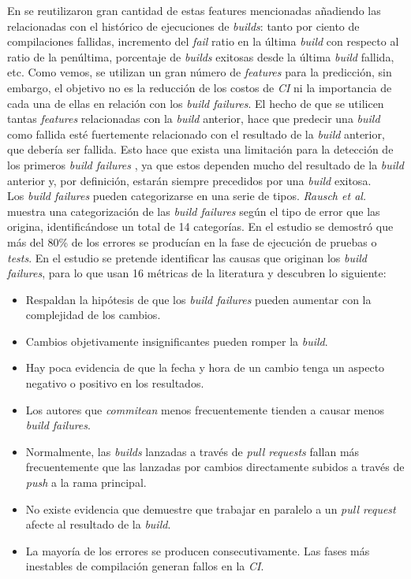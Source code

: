 En \cite{6} se reutilizaron gran cantidad de estas features mencionadas añadiendo las
relacionadas con el histórico de ejecuciones de \textit{builds}: tanto por ciento de compilaciones
fallidas, incremento del \textit{fail} ratio en la última \textit{build} con respecto al ratio
de la penúltima, porcentaje de \textit{builds} exitosas desde la última \textit{build} fallida,
etc. Como vemos, se utilizan un gran número de \textit{features} para la predicción, sin embargo,
el objetivo no es la reducción de los costos de \textit{CI} ni la  importancia de cada una de
ellas en relación con los \textit{build failures}. El hecho de que se utilicen tantas
\textit{features} relacionadas con la \textit{build} anterior, hace que predecir una
\textit{build} como fallida esté fuertemente relacionado con el resultado de la \textit{build}
anterior, que debería ser fallida. Esto hace que exista una limitación para la detección de los
primeros \textit{build failures} \cite{2}, ya que estos dependen mucho del resultado de la
\textit{build} anterior y, por definición, estarán siempre precedidos por una \textit{build}
exitosa.\\

Los \textit{build failures} pueden categorizarse en una serie de tipos. \textit{Rausch et al.}
\cite{13} muestra una categorización de las \textit{build failures} según el tipo de error
que las origina, identificándose un total de 14 categorías. En el estudio se demostró que más
del 80\% de los errores se producían en la fase de ejecución de pruebas o \textit{tests}. En
el estudio se pretende identificar las causas que originan los \textit{build failures}, para lo
que usan 16 métricas de la literatura y descubren lo siguiente:

\begin{itemize}
      \item Respaldan la hipótesis de que los \textit{build failures} pueden aumentar con la 
      complejidad de los cambios.
      \item Cambios objetivamente insignificantes pueden romper la \textit{build}.
      \item Hay poca evidencia de que la fecha y hora de un cambio tenga un aspecto negativo o
      positivo en los resultados.
      \item Los autores que \textit{commitean} menos frecuentemente tienden a causar menos
      \textit{build failures}.
      \item Normalmente, las \textit{builds} lanzadas a través de \textit{pull requests} fallan
      más frecuentemente que las lanzadas por cambios directamente subidos a través de
      \textit{push} a la rama principal.
      \item No existe evidencia que demuestre que trabajar en paralelo a un \textit{pull request}
      afecte al resultado de la \textit{build}.
      \item La mayoría de los errores se producen consecutivamente. Las fases más inestables de
      compilación generan fallos en la \textit{CI}.
\end{itemize}

